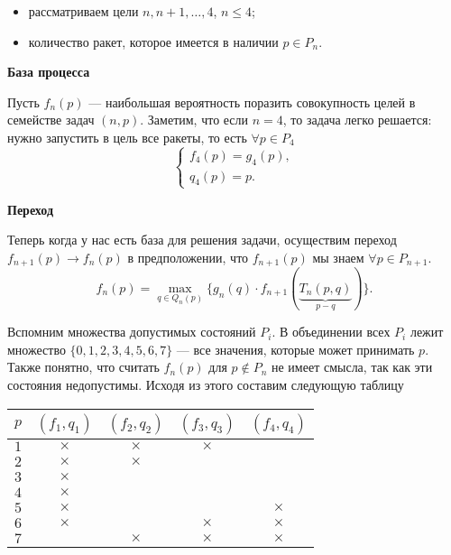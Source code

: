 \begin{itemize}[nosep]
	\item рассматриваем цели $n, n+1, \dots, 4$, $n \le 4$;
	
	\item количество ракет, которое имеется в наличии $p \in P_n$.
\end{itemize}

\bigskip

\textbf{База процесса}

Пусть $f_n(p)$ --- наибольшая вероятность поразить совокупность целей в семействе задач $(n, p)$. Заметим, что если $n = 4$, то задача легко решается: нужно запустить в цель все ракеты, то есть $\forall p \in P_4$
\[
\begin{cases}
	f_4(p) = g_4(p), \\
	q_4(p) = p.
\end{cases}
\]

\bigskip

\textbf{Переход}

Теперь когда у нас есть база для решения задачи, осуществим переход $f_{n+1}(p) \to f_n(p)$ в предположении, что $f_{n+1}(p)$ мы знаем $\forall p \in P_{n + 1}$.
\[
\boxed{f_n(p) = \max_{q \in Q_n(p)} \Big\{ g_n(q) \cdot f_{n + 1}(\underbrace{T_n(p, q)}_{p - q}) \Big\}}.\tag{**}
\]

Вспомним множества допустимых состояний $P_i$. В объединении всех $P_i$ лежит множество $\{0, 1, 2, 3, 4, 5, 6, 7\}$ --- все значения, которые может принимать $p$. Также понятно, что считать $f_n(p)$ для $p \notin P_n$ не имеет смысла, так как эти состояния недопустимы. Исходя из этого составим следующую таблицу

\begin{table}[H]
	\centering
	\begin{tabular}{ | c | c | c | c | c | } 
		\hline
		$p$ & $(f_1, q_1)$ & $(f_2, q_2)$ & $(f_3, q_3)$ & $(f_4, q_4)$ \\ 
		\hline
		$1$ & $\times$ & $\times$ & $\times$ & \\\hline
		$2$ & $\times$ & $\times$ & & \\\hline
		$3$ & $\times$ & & & \\\hline
		$4$ & $\times$ & & & \\\hline
		$5$ & $\times$ & & & $\times$ \\\hline
		$6$ & $\times$ & & $\times$ & $\times$ \\\hline
		$7$ & & $\times$ & $\times$ & $\times$ \\\hline
	\end{tabular}
\end{table}

